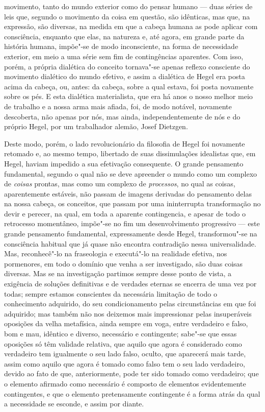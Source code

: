 movimento, tanto do mundo exterior como do pensar humano --- duas séries
de leis que, segundo o movimento da coisa em questão, são
idênticas, mas que, na expressão, são diversas, na medida em que a
cabeça humana as pode aplicar com consciência, enquanto que elas, na
natureza e, até agora, em grande parte da história humana,
impõe"-se de modo inconsciente, na forma de necessidade exterior, em meio
a uma série sem fim de contingências aparentes. Com isso, porém, a
própria dialética do conceito tornava"-se apenas reflexo consciente do
movimento dialético do mundo efetivo, e assim a dialética
de Hegel era
posta acima da cabeça, ou, antes: da 
cabeça, sobre a qual estava, foi posta novamente sobre os pés. E esta
dialética materialista, que era há anos o nosso melhor meio de trabalho
e a nossa arma mais afiada, foi, de modo notável, novamente descoberta,
não apenas por nós, mas ainda, independentemente de nós e do próprio
Hegel,
por um trabalhador
alemão, Josef Dietzgen.

Deste modo, porém, o lado revolucionário da filosofia
de Hegel foi
novamente retomado e, ao mesmo tempo, libertado de suas dissimulações
idealistas que,
em Hegel,
haviam impedido a sua efetivação consequente. O grande pensamento
fundamental, segundo o qual não se deve apreender o mundo como um
complexo de \emph{coisas }prontas, mas como um complexo
de \emph{processos}, no qual as coisas, aparentemente estáveis, não
passam de imagens derivadas do pensamento delas na nossa cabeça, os
conceitos, que passam por uma ininterrupta transformação no devir e perecer,
na qual, em toda a aparente contingencia, e apesar de todo o retrocesso
momentâneo, impõe"-se no fim um desenvolvimento progressivo --- este grande
pensamento fundamental, expressamente
desde Hegel,
transformou"-se na consciência habitual que já quase não encontra
contradição nessa universalidade. Mas, reconhecê"-lo na fraseologia e
executá"-lo na realidade efetiva, nos pormenores, em todo o domínio que
venha a ser investigado, são duas coisas diversas. Mas se na
investigação partimos sempre desse ponto de vista,
 a exigência de soluções definitivas e de
verdades eternas se encerra de uma vez por todas; sempre estamos
conscientes da necessária limitação de todo o conhecimento adquirido, do
seu condicionamento pelas circunstâncias em que foi adquirido; mas
também não nos deixemos mais impressionar pelas insuperáveis oposições da velha
metafísica, ainda sempre em voga, entre verdadeiro e falso, bom e mau,
idêntico e diverso, necessário e contingente; sabe"-se que essas
oposições só têm validade relativa, que aquilo que agora é considerado
como verdadeiro tem igualmente o seu lado falso, oculto, que aparecerá
mais tarde, assim como aquilo que agora é tomado como falso tem o seu
lado verdadeiro, devido ao fato de que, anteriormente, pode ter sido
tomado como verdadeiro; que o elemento afirmado como necessário é
composto de elementos evidentemente contingentes, e que o elemento
pretensamente contingente é a forma atrás da qual a necessidade se
esconde, e assim por diante.


